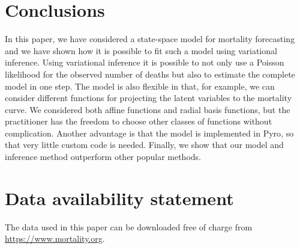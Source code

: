 \documentclass[11pt]{article}
\begin{document}
\section{Conclusions}\label{sec:conclusions}
In this paper, we have considered a state-space model for mortality forecasting and we have shown how it is possible to fit such a model using variational inference. Using variational inference it is possible to not only use a Poisson likelihood for the observed number of deaths but also to estimate the complete model in one step. The model is also flexible in that, for example, we can consider different functions for projecting the latent variables to the mortality curve. We considered both affine functions and radial basis functions, but the practitioner has the freedom to choose other classes of functions without complication. Another advantage is that the model is implemented in Pyro, so that very little custom code is needed. Finally, we show that our model and inference method outperform other popular methods.

\section*{Data availability statement}
The data used in this paper can be downloaded free of charge from \url{https://www.mortality.org}.
    


\end{document}

